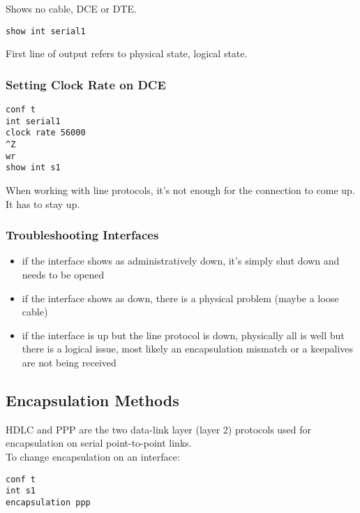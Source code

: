 Shows no cable, DCE or DTE.

\begin{verbatim}
show int serial1
\end{verbatim}

First line of output refers to physical state, logical state.

\subsubsection{Setting Clock Rate on DCE}

\begin{verbatim}
conf t
int serial1
clock rate 56000
^Z
wr
show int s1
\end{verbatim}

When working with line protocols, it's not enough for the connection to
come up. It has to stay up.\\

\subsubsection{Troubleshooting Interfaces}

\begin{itemize}

\item if the interface shows as administratively down, it's simply shut
down and needs to be opened

\item if the interface shows as down, there is a physical problem (maybe
a loose cable)

\item if the interface is up but the line protocol is down, physically
all is well but there is a logical issue, most likely an encapsulation
mismatch or a keepalives are not being received

\end{itemize}

\subsection{Encapsulation Methods}

HDLC and PPP are the two data-link layer (layer 2) protocols used for
encapsulation on serial point-to-point links.\\

To change encapsulation on an interface:

\begin{verbatim}
conf t
int s1
encapsulation ppp
\end{verbatim}


